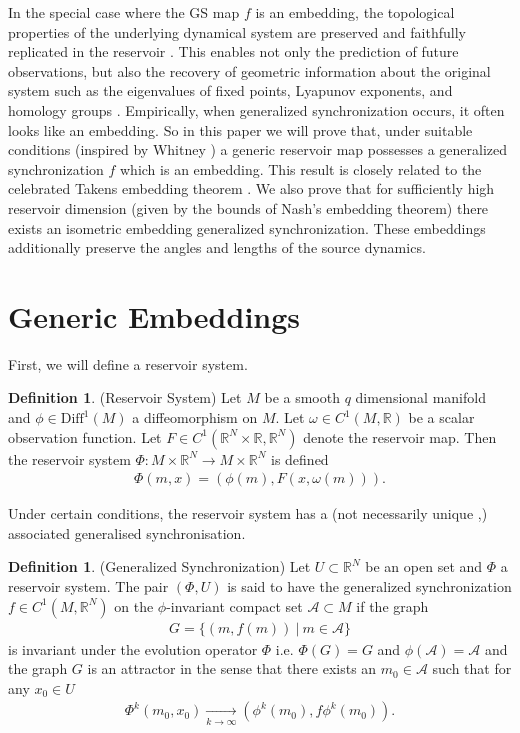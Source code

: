 \documentclass{article}
\theoremstyle{definition}
\newtheorem{defn}[theorem]{Definition}
\theoremstyle{definition}
\numberwithin{theorem}{section}
\begin{document}
In the special case where the GS map $f$ is an embedding, the topological properties of the underlying dynamical system are preserved and faithfully replicated in the reservoir \cite{Hart2020, Verzelli2020, Pathak2017a}. This enables not only the prediction of future observations, but also the recovery of geometric information about the original system such as the eigenvalues of fixed points, Lyapunov exponents, and homology groups \cite{Hart2020, Pathak2017a}. Empirically, when generalized synchronization occurs, it often looks like an embedding. So in this paper we will prove that, under suitable conditions (inspired by Whitney \cite{Whitney1936}) a generic reservoir map possesses a generalized synchronization $f$ which is an embedding. This result is closely related to the celebrated Takens embedding theorem \cite{Takens1981Detecting, Grigoryeva2023}. We also prove that for sufficiently high reservoir dimension (given by the bounds of Nash's embedding theorem) there exists an isometric embedding generalized synchronization. These embeddings additionally preserve the angles and lengths of the source dynamics.

\section{Generic Embeddings}

First, we will define a reservoir system.

\begin{defn}
    (Reservoir System) Let $M$ be a smooth $q$ dimensional manifold and $\phi \in \text{Diff}^1(M)$ a diffeomorphism on $M$. Let $\omega \in C^1(M,\mathbb{R})$ be a scalar observation function. Let $F \in C^1(\mathbb{R}^N \times \mathbb{R}, \mathbb{R}^N)$ denote the reservoir map. Then the reservoir system $\Phi : M \times \mathbb{R}^N \to M \times \mathbb{R}^N$ is defined
    \begin{align*}
        \Phi(m,x) = (\phi(m), F(x,\omega(m))).
    \end{align*}
\end{defn}

Under certain conditions, the reservoir system has a (not necessarily unique \cite{Grigoryeva2021},\cite{ceni2020echo}) associated generalised synchronisation.

\begin{defn}
    (Generalized Synchronization) Let $U \subset \mathbb{R}^N$ be an open set and $\Phi$ a reservoir system. The pair $(\Phi,U)$ is said to have the generalized synchronization $f \in C^1(M,\mathbb{R}^N)$ on the $\phi$-invariant compact set $\mathcal{A} \subset M$ if the graph
    \begin{align*}
        G = \{ (m,f(m)) \ | \ m \in \mathcal{A} \}
    \end{align*}
    is invariant under the evolution operator $\Phi$ i.e. $\Phi(G) = G$ and $\phi(\mathcal{A}) = \mathcal{A}$ and the graph $G$ is an attractor in the sense that there exists an $m_0 \in \mathcal{A}$ such that for any $x_0 \in U$
    \begin{align*}
        \Phi^k(m_0,x_0) \xrightarrow[k \to \infty]{} (\phi^k(m_0),f\phi^k(m_0)).
    \end{align*}
\end{defn}
\end{document}

